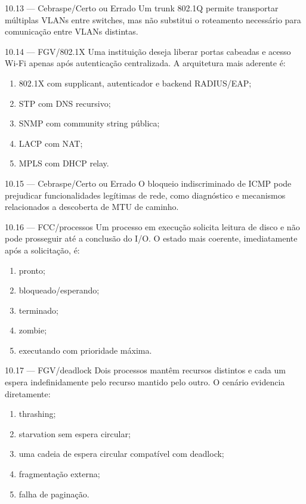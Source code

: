 \begin{questao}{ 10.13 — Cebraspe/Certo ou Errado}
Um trunk 802.1Q permite transportar múltiplas VLANs entre switches, mas não substitui o roteamento necessário para comunicação entre VLANs distintas.
\end{questao}

\begin{questao}{ 10.14 — FGV/802.1X}
Uma instituição deseja liberar portas cabeadas e acesso Wi-Fi apenas após autenticação centralizada. A arquitetura mais aderente é:
\begin{enumerate}[label=\Alph*)]
\item 802.1X com supplicant, autenticador e backend RADIUS/EAP;
\item STP com DNS recursivo;
\item SNMP com community string pública;
\item LACP com NAT;
\item MPLS com DHCP relay.
\end{enumerate}
\end{questao}

\begin{questao}{ 10.15 — Cebraspe/Certo ou Errado}
O bloqueio indiscriminado de ICMP pode prejudicar funcionalidades legítimas de rede, como diagnóstico e mecanismos relacionados a descoberta de MTU de caminho.
\end{questao}

\begin{questao}{ 10.16 — FCC/processos}
Um processo em execução solicita leitura de disco e não pode prosseguir até a conclusão do I/O. O estado mais coerente, imediatamente após a solicitação, é:
\begin{enumerate}[label=\Alph*)]
\item pronto;
\item bloqueado/esperando;
\item terminado;
\item zombie;
\item executando com prioridade máxima.
\end{enumerate}
\end{questao}

\begin{questao}{ 10.17 — FGV/deadlock}
Dois processos mantêm recursos distintos e cada um espera indefinidamente pelo recurso mantido pelo outro. O cenário evidencia diretamente:
\begin{enumerate}[label=\Alph*)]
\item thrashing;
\item starvation sem espera circular;
\item uma cadeia de espera circular compatível com deadlock;
\item fragmentação externa;
\item falha de paginação.
\end{enumerate}
\end{questao}

